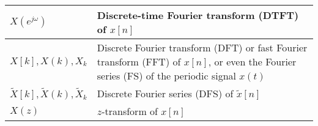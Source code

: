\begin{xltabular}{\textwidth}{XX}
	\(X(e^{j\omega})\)                                                                                                      & Discrete-time Fourier transform (DTFT) of \(x[n]\)                                                                                            \\ \hline
	\(X[k], X(k), X_k\)                                                                                                     & Discrete Fourier transform (DFT) or fast Fourier transform (FFT) of \(x[n]\), or even the Fourier series (FS) of the periodic signal \(x(t)\) \\ \hline
	\(\tilde{X}[k], \tilde{X}(k), \tilde{X}_k\)                                                                             & Discrete Fourier series (DFS) of \(\tilde{x}[n]\)                                                                                             \\ \hline
	\(X(z)\)                                                                                                                & \(z\)-transform of \(x[n]\)                                                                                                                   \\
\end{xltabular}